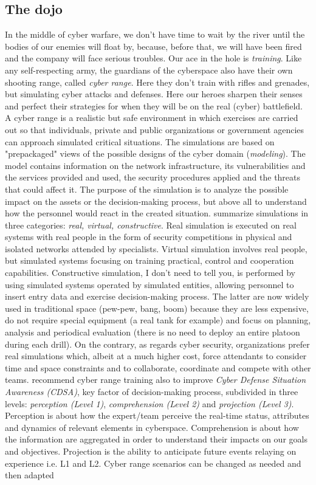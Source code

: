 \subsection{The dojo}
In the middle of cyber warfare, we don't have time to wait by the river until the bodies of our enemies will float by, because, before that, we will have been fired and the company will face serious troubles. Our ace in the hole is \textit{training}. Like any self-respecting army, the guardians of the cyberspace also have their own shooting range, called \textit{cyber range}. Here they don't train with rifles and grenades, but simulating cyber attacks and defenses. Here our heroes sharpen their senses and perfect their strategies for when they will be on the real (cyber) battlefield. A cyber range is a realistic but safe environment in which exercises are carried out so that individuals, private and public organizations or government agencies can approach simulated critical situations. The simulations are based on "prepackaged" views of the possible designs of the cyber domain (\textit{modeling}). The model contains information on the network infrastructure, its vulnerabilities and the services provided and used, the security procedures applied and the threats that could affect it. The purpose of the simulation is to analyze the possible impact on the assets or the decision-making process, but above all to understand how the personnel would react in the created situation. \cite{Subasu2017} summarize simulations in three categories: \textit{real, virtual, constructive}. Real simulation is executed on real systems with real people in the form of security competitions in physical and isolated networks attended by specialists. Virtual simulation involves real people, but simulated systems focusing on training practical, control and cooperation capabilities. Constructive simulation, I don't need to tell you, is performed by using simulated systems operated by simulated entities, allowing personnel to insert entry data and exercise decision-making process. The latter are now widely used in traditional space (pew-pew, bang, boom) because they are less expensive, do not require special equipment (a real tank for example) and focus on planning, analysis and periodical evaluation (there is no need to deploy an entire platoon during each drill). On the contrary, as regards cyber security, organizations prefer real simulations which, albeit at a much higher cost, force attendants to consider time and space constraints and to collaborate, coordinate and compete with other teams. \cite{Debatty2019} recommend cyber range training also to improve \textit{Cyber Defense Situation Awareness (CDSA)}, key factor of decision-making process, subdivided in three levels: \textit{perception (Level 1)}, \textit{comprehension (Level 2)} and \textit{projection (Level 3)}. Perception is about how the expert/team perceive the real-time status, attributes and dynamics of relevant elements in cyberspace. Comprehension is about how the information are aggregated in order to understand their impacts on our goals and objectives. Projection is the ability to anticipate future events relaying on experience i.e. L1 and L2. Cyber range scenarios can be changed as needed and then adapted 